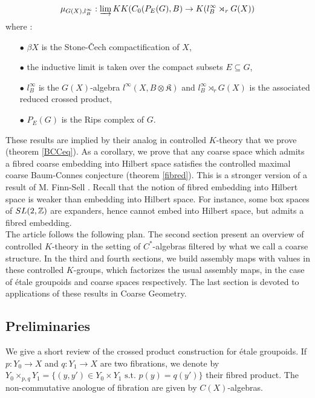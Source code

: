 \[\mu_{G(X),l^\infty_B} : \varinjlim KK(C_0(P_E(G),B) \rightarrow K(l^\infty_B\rtimes_r G(X))\]
where :
\begin{itemize}
\item[$\bullet$] $\beta X$ is the Stone-\v{C}ech compactification of $X$,
\item[$\bullet$] the inductive limit is taken over the compact subsets $E\subseteq G$,
\item[$\bullet$] $l^\infty_B$ is the $G(X)$-algebra $l^\infty (X,B\otimes \mathfrak K)$ and $l^\infty_B\rtimes_r G(X)$ is the associated reduced crossed product,
\item[$\bullet$] $P_E(G)$ is the Rips complex of $G$.
\end{itemize}
These results are implied by their analog in controlled $K$-theory that we prove (theorem \ref{BCCeq}). As a corollary, we prove that any coarse space which admits a fibred coarse embedding into Hilbert space satisfies the controlled maximal coarse Baum-Connes conjecture (theorem \ref{fibred}). This is a stronger version of a result of M. Finn-Sell \cite{FinnSellFibred}. Recall that the notion of fibred embedding into Hilbert space is weaker than embedding into Hilbert space. For instance, some box spaces of $SL(2,\mathbb Z)$ are expanders, hence cannot embed into Hilbert space, but admits a fibred embedding.\\ 

The article follows the following plan. The second section present an overview of controlled $K$-theory in the setting of $C^*$-algebras filtered by what we call a coarse structure. In the third and fourth sections, we build assembly maps with values in these controlled $K$-groups, which factorizes the usual assembly maps, in the case of étale groupoids and coarse spaces respectively. The last section is devoted to applications of these results in Coarse Geometry.

\subsection{Preliminaries}

We give a short review of the crossed product construction for étale groupoids. If $p : Y_0\rightarrow X$ and $q : Y_1\rightarrow X$ are two fibrations, we denote by $Y_0\times_{p,q} Y_1 = \{(y,y')\in Y_0\times Y_1 \text{ s.t. } p(y)=q(y')\}$ their fibred product. The non-commutative anologue of fibration are given by $C(X)$-algebras. 

